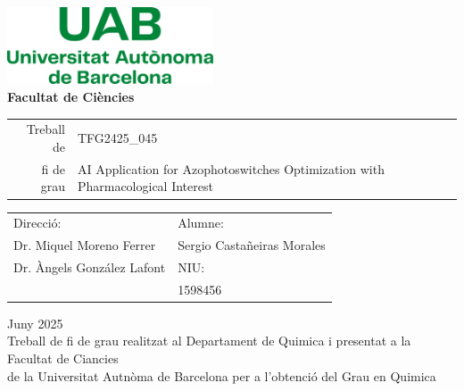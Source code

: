 \documentclass[11pt]{article}
\newcommand\NomComplet{Sergio Castañeiras Morales}
\newcommand\NIU{1598456}
\newcommand\NomProfeA{Dr. Miquel Moreno Ferrer}
\newcommand\NomProfeB{Dr. Àngels González Lafont}
\newcommand\CodiTFG{TFG2425\_045}
\newcommand\TitolTFG{AI Application for Azophotoswitches Optimization with Pharmacological Interest}
\newcommand\NomCentre{Departament de Quimica } %
\newcommand\NomGrau{Quimica}
\newcommand\Mes{Juny } %
\newcommand\Any{2025}
\begin{document}
\begin{titlepage}

\center %


\includegraphics[width = 6.1cm]{GeneralSources/Logo_uab.png}\\[1.76cm] %


\textbf{\LARGE Facultat de Ciències}\\[3.53cm] %
\begin{flushright}
\begin{tabular}{r | p{}}
  {\Large Treball de} & {\LARGE \CodiTFG}\\
  {\LARGE fi de grau}  & {\LARGE \TitolTFG}
\end{tabular}
\end{flushright}\vspace{5.06cm}




\begin{tabular}{p{} p{}}
\large
Direcció: & Alumne: \\
\NomProfeA & \NomComplet\\
\NomProfeB & NIU: \\
 & \NIU
\end{tabular}
\vspace{0.5cm}



{\Large \Mes \Any}\\[0.5cm] %

Treball de fi de grau realitzat al \NomCentre i presentat a la\\ Facultat de Ciancies\\ de la Universitat Autnòma de Barcelona per a l'obtenció del Grau en \NomGrau


\end{titlepage}
\end{document}
